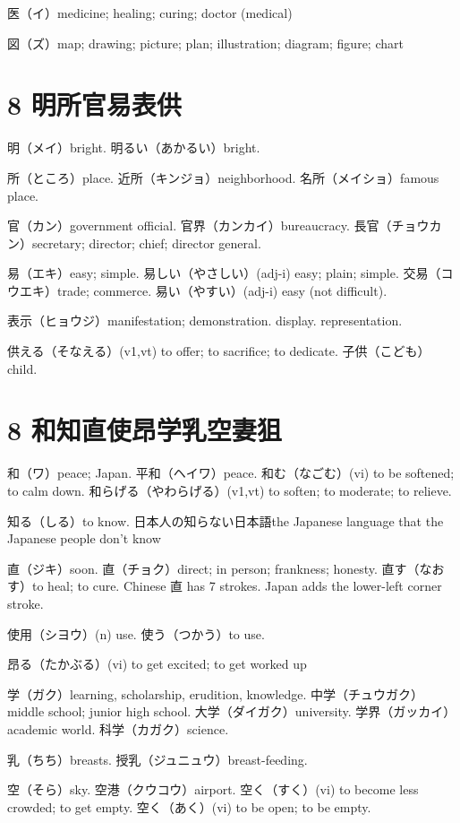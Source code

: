 医（イ）medicine; healing; curing; doctor (medical)

図（ズ）map; drawing; picture; plan; illustration; diagram; figure; chart

\section{8 明所官易表供}

明（メイ）bright.
明るい（あかるい）bright.

所（ところ）place.
近所（キンジョ）neighborhood.
名所（メイショ）famous place.

官（カン）government official.
官界（カンカイ）bureaucracy.
長官（チョウカン）secretary; director; chief; director general.

易（エキ）easy; simple.
易しい（やさしい）(adj-i) easy; plain; simple.
交易（コウエキ）trade; commerce.
易い（やすい）(adj-i) easy (not difficult).

表示（ヒョウジ）manifestation; demonstration. display. representation.

供える（そなえる）(v1,vt) to offer; to sacrifice; to dedicate.
子供（こども）child.

\section{8 和知直使昂学乳空妻狙}

和（ワ）peace; Japan.
平和（ヘイワ）peace.
和む（なごむ）(vi) to be softened; to calm down.
和らげる（やわらげる）(v1,vt) to soften; to moderate; to relieve.

知る（しる）to know.
日本人の知らない日本語the Japanese language that the Japanese people don't know

直（ジキ）soon.
直（チョク）direct; in person; frankness; honesty.
直す（なおす）to heal; to cure.
Chinese 直 has 7 strokes.
Japan adds the lower-left corner stroke.

使用（シヨウ）(n) use.
使う（つかう）to use.

昂る（たかぶる）(vi) to get excited; to get worked up

学（ガク）learning, scholarship, erudition, knowledge.
中学（チュウガク）middle school; junior high school.
大学（ダイガク）university.
学界（ガッカイ）academic world.
科学（カガク）science.

乳（ちち）breasts.
授乳（ジュニュウ）breast-feeding.

空（そら）sky.
空港（クウコウ）airport.
空く（すく）(vi) to become less crowded; to get empty.
空く（あく）(vi) to be open; to be empty.

